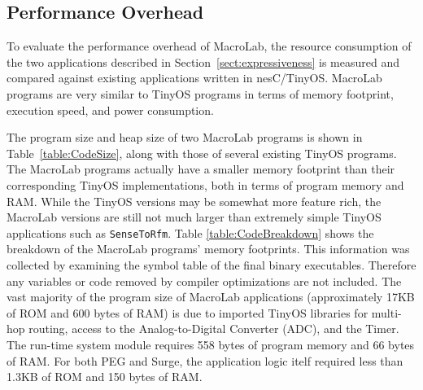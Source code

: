 \subsection{Performance Overhead} \label{sec:performance}

To evaluate the performance overhead of MacroLab, the resource consumption of
the two applications described in Section~\ref{sect:expressiveness} is measured
and compared against existing applications written in nesC/TinyOS. MacroLab
programs are very similar to TinyOS programs in terms of memory footprint,
execution speed, and power consumption.

The program size and heap size of two MacroLab programs is shown in
Table~\ref{table:CodeSize}, along with those of several existing TinyOS
programs.  The MacroLab programs actually have a smaller memory footprint than
their corresponding TinyOS implementations, both in terms of program memory and
RAM. While the TinyOS versions may be somewhat more feature rich, the MacroLab
versions are still not much larger than extremely simple TinyOS applications
such as {\tt SenseToRfm}.  Table \ref{table:CodeBreakdown} shows the breakdown
of the MacroLab programs' memory footprints.  This information was collected by
examining the symbol table of the final binary executables.  Therefore any
variables or code removed by compiler optimizations are not included. The vast
majority of the program size of MacroLab applications (approximately 17KB of ROM
and 600 bytes of RAM) is due to imported TinyOS libraries for multi-hop routing,
access to the Analog-to-Digital Converter (ADC), and the Timer.  The run-time
system module requires 558 bytes of program memory and 66 bytes of RAM.  For
both PEG and Surge, the application logic itelf required less than 1.3KB of ROM
and 150 bytes of RAM.


